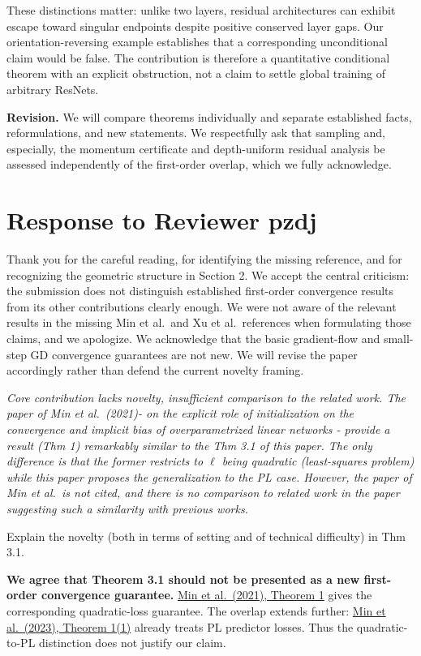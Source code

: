 \documentclass[11pt,a4paper]{article}
\renewenvironment{quote}
  {\par\addvspace{0.8em}\Needspace{8\baselineskip}%
    \list{}{\leftmargin=1.2em\rightmargin=0pt\topsep=0.25em
    \parsep=0.3em}\item\relax\normalsize\itshape\color{quotegray}}
  {\endlist\nopagebreak[4]}
\newif\iffirstreviewer
\newcommand{\reviewer}[1]{%
  \iffirstreviewer\firstreviewerfalse\else\clearpage\fi
  \markright{#1}%
  \section{#1}%
}
\begin{document}
These distinctions matter: unlike two layers, residual architectures can exhibit escape toward singular endpoints despite positive conserved layer gaps. Our orientation-reversing example establishes that a corresponding unconditional claim would be false. The contribution is therefore a quantitative conditional theorem with an explicit obstruction, not a claim to settle global training of arbitrary ResNets.

\textbf{Revision.} We will compare theorems individually and separate established facts, reformulations, and new statements. We respectfully ask that sampling and, especially, the momentum certificate and depth-uniform residual analysis be assessed independently of the first-order overlap, which we fully acknowledge.

\reviewer{Response to Reviewer pzdj}\label{response-to-reviewer-pzdj}

Thank you for the careful reading, for identifying the missing reference, and for recognizing the geometric structure in Section 2. We accept the central criticism: the submission does not distinguish established first-order convergence results from its other contributions clearly enough. We were not aware of the relevant results in the missing Min et al.~and Xu et al.~references when formulating those claims, and we apologize. We acknowledge that the basic gradient-flow and small-step GD convergence guarantees are not new. We will revise the paper accordingly rather than defend the current novelty framing.

\begin{quote}
Core contribution lacks novelty, insufficient comparison to the related work. The paper of Min et al.~(2021)- on the explicit role of initialization on the convergence and implicit bias of overparametrized linear networks - provide a result (Thm 1) remarkably similar to the Thm 3.1 of this paper. The only difference is that the former restricts to \(\ell\) being quadratic (least-squares problem) while this paper proposes the generalization to the PL case. However, the paper of Min et al.~is not cited, and there is no comparison to related work in the paper suggesting such a similarity with previous works.

Explain the novelty (both in terms of setting and of technical difficulty) in Thm 3.1.
\end{quote}

\textbf{We agree that Theorem 3.1 should not be presented as a new first-order convergence guarantee.} \href{https://proceedings.mlr.press/v139/min21c/min21c.pdf}{Min et al.~(2021), Theorem 1} gives the corresponding quadratic-loss guarantee. The overlap extends further: \href{https://proceedings.mlr.press/v202/min23d/min23d.pdf}{Min et al.~(2023), Theorem 1(1)} already treats PL predictor losses. Thus the quadratic-to-PL distinction does not justify our claim.
\end{document}
